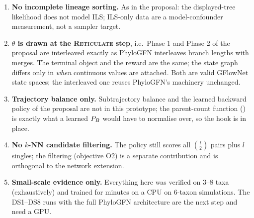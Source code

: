 \begin{enumerate}[leftmargin=*]
\item \textbf{No incomplete lineage sorting.} As in the proposal: the displayed-tree likelihood does not model ILS; ILS-only data are a model-confounder measurement, not a sampler target.
\item \textbf{$\theta$ is drawn at the \textsc{Reticulate} step}, i.e.\ Phase 1 and Phase 2 of the proposal are interleaved exactly as PhyloGFN interleaves branch lengths with merges. The terminal object and the reward are the same; the state graph differs only in \emph{when} continuous values are attached. Both are valid GFlowNet state spaces; the interleaved one reuses PhyloGFN's machinery unchanged.
\item \textbf{Trajectory balance only.} Subtrajectory balance and the learned backward policy of the proposal are not in this prototype; the parent-count function () is exactly what a learned $P_B$ would have to normalise over, so the hook is in place.
\item \textbf{No $k$-NN candidate filtering.} The policy still scores all $\binom{l}{2}$ pairs plus $l$ singles; the filtering (objective O2) is a separate contribution and is orthogonal to the network extension.
\item \textbf{Small-scale evidence only.} Everything here was verified on 3--8 taxa (exhaustively) and trained for minutes on a CPU on 6-taxon simulations. The DS1--DS8 runs with the full PhyloGFN architecture are the next step and need a GPU.
\end{enumerate}
\clearpage
